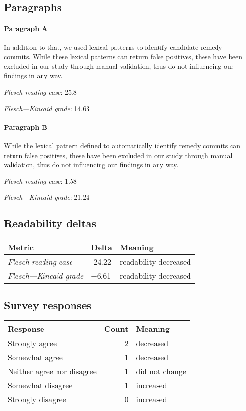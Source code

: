 \subsection{Paragraphs}
\paragraph{Paragraph A}
In addition to that, we used lexical patterns to identify candidate remedy commits. While these lexical patterns can return false positives, these have been excluded in our study through manual validation, thus do not influencing our findings in any way.\par\medskip
\emph{Flesch reading ease}: 25.8\par
\emph{Flesch---Kincaid grade}: 14.63

\paragraph{Paragraph B}
While the lexical pattern defined to automatically identify remedy commits can return false positives, these have been excluded in our study through manual validation, thus do not influencing our findings in any way.\par\medskip
\emph{Flesch reading ease}: 1.58\par
\emph{Flesch---Kincaid grade}: 21.24

\subsection{Readability deltas}

\begin{tabular}{lll}
\toprule
               \textbf{Metric} & \textbf{Delta} &       \textbf{Meaning} \\
\midrule
    \emph{Flesch reading ease} &         -24.22 &  readability decreased \\
 \emph{Flesch---Kincaid grade} &          +6.61 &  readability decreased \\
\bottomrule
\end{tabular}

\subsection{Survey responses}
\begin{tabular}{lrl}
\toprule
          \textbf{Response} &  \textbf{Count} & \textbf{Meaning} \\
\midrule
             Strongly agree &               2 &        decreased \\
             Somewhat agree &               1 &        decreased \\
 Neither agree nor disagree &               1 &   did not change \\
          Somewhat disagree &               1 &        increased \\
          Strongly disagree &               0 &        increased \\
\bottomrule
\end{tabular}

